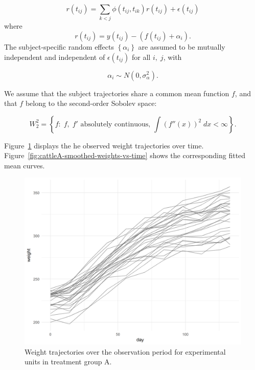 \documentclass[12pt]{article}
\theoremstyle{definition}
\begin{document}
\begin{equation} \label{eq:cattleA-dynamic-cond-mixed-model-1}
r\left(t_{ij}\right) = \sum_{k < j} \phi\left( t_{ij}, t_{ik} \right) r\left(t_{ij}\right) + \epsilon\left(t_{ij}\right)
\end{equation}
\noindent
where
\begin{equation} \label{eq:cattleA-dynamic-cond-mixed-model-2}
r\left(t_{ij}\right) = y\left(t_{ij}\right) - \left(f\left(t_{ij} \right) + \alpha_{i}\right).
\end{equation}
\noindent
The subject-specific random effects $\left\{ \alpha_i \right\}$ are assumed to be mutually independent and independent of $ \epsilon\left(t_{ij}\right)$ for all $i,\;j$, with

\[
\alpha_i \sim N\left( 0, \sigma_\alpha^2 \right).
\]

We assume that the subject trajectories share a common mean function $f$, and that $f$ belong to the second-order Sobolev space:

\[
W^2_2 = \left\{f: \; f,\;f' \mbox{ absolutely continuous, } \int\left(f''\left(x\right)\right)^2 \;dx < \infty  \right\}.
\]
\noindent

Figure~\ref{fig:cattleA-weights-vs-time} displays the he observed weight trajectories over time. Figure~\ref{fig:cattleA-smoothed-weights-vs-time} shows the corresponding fitted mean curves.

\begin{figure}[h] \label{fig:cattleA-weights-vs-time}
\begin{center}
    \includegraphics[width=\textwidth]{img/cattle/cattleA-weights-vs-time}
\end{center}
 \caption{Weight trajectories over the observation period for experimental units in treatment group A.}
 \end{figure}
\end{document}
